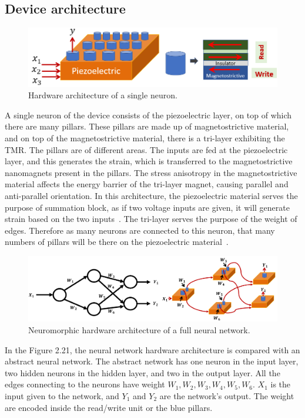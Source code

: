 \documentclass[12pt,a4paper,bold]{thesis}
\theoremstyle{thm}
\theoremstyle{definition}
\begin{document}
\subsection{Device architecture} 
\begin{figure}[H]
	\centering
   \includegraphics[width=13cm]{Images/56.png} 
   \caption{Hardware architecture of a single neuron.}
\end{figure}
\indent\indent A single neuron of the device consists of the piezoelectric layer, on top of which there are many pillars. These pillars are made up of magnetostrictive material, and on top of the magnetostrictive material, there is a tri-layer exhibiting the TMR. The pillars are of different areas. The inputs are fed at the piezoelectric layer, and this generates the strain, which is transferred to the magnetostrictive nanomagnets present in the pillars. The stress anisotropy in the magnetostrictive material affects the energy barrier of the tri-layer magnet, causing parallel and anti-parallel orientation. In this architecture, the piezoelectric material serves the purpose of summation block, as if two voltage inputs are given, it will generate strain based on the two inputs~\cite{roy13x}. The tri-layer serves the purpose of the weight of edges. Therefore as many neurons are connected to this neuron, that many numbers of pillars will be there on the piezoelectric material~\cite{roy15_1}.

\begin{figure}[H]
	\centering
   \includegraphics[width=13cm]{Images/57.png} 
   \caption{Neuromorphic hardware architecture of a full neural network.}
\end{figure}
\indent\indent In the Figure 2.21, the neural network hardware architecture is compared with an abstract neural network. The abstract network has one neuron in the input layer, two hidden neurons in the hidden layer, and two in the output layer. All the edges connecting to the neurons have weight $W_1, W_2, W_3, W_4, W_5, W_6$. $X_1$ is the input given to the network, and $Y_1$ and $Y_2$ are the network's output.
The weight are encoded inside the read/write unit or the blue pillars.
\end{document}
